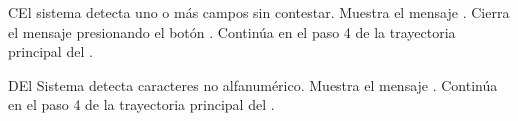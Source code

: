 \begin{UCtrayectoriaA}{C}{El sistema detecta uno o más campos sin contestar.}
    \UCpaso Muestra el mensaje .
    \UCpaso[\UCactor] Cierra el mensaje presionando el botón .
    \UCpaso Continúa en el paso 4 de la trayectoria principal del .
\end{UCtrayectoriaA}
\begin{UCtrayectoriaA}{D}{El Sistema detecta caracteres no alfanumérico.}
    \UCpaso Muestra el mensaje .
    \UCpaso Continúa en el paso 4 de la trayectoria principal del .
\end{UCtrayectoriaA}